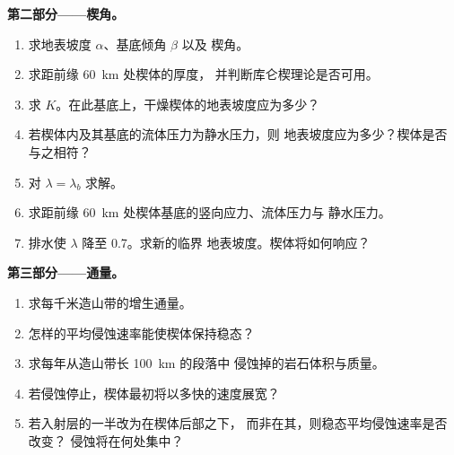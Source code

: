 \begin{problem}
\medskip\noindent\textbf{第二部分——楔角。}
\begin{enumerate}[resume]
  \item 求地表坡度 $\alpha$、基底倾角 $\beta$ 以及
        楔角。
  \item 求距前缘 \qty{60}{km} 处楔体的厚度，
        并判断库仑楔理论是否可用。
  \item 求 $K$。在此基底上，干燥楔体的地表坡度应为多少？
  \item 若楔体内及其基底的流体压力为静水压力，则
        地表坡度应为多少？楔体是否与之相符？
  \item 对 $\lambda = \lambda_b$ 求解。
  \item 求距前缘 \qty{60}{km} 处楔体基底的竖向应力、流体压力与
        静水压力。
  \item 排水使 $\lambda$ 降至 0.7。求新的临界
        地表坡度。楔体将如何响应？
\end{enumerate}

\medskip\noindent\textbf{第三部分——通量。}
\begin{enumerate}[resume]
  \item 求每千米造山带的增生通量。
  \item 怎样的平均侵蚀速率能使楔体保持稳态？
  \item 求每年从造山带长 \qty{100}{km} 的段落中
        侵蚀掉的岩石体积与质量。
  \item 若侵蚀停止，楔体最初将以多快的速度展宽？
  \item 若入射层的一半改为在楔体后部之下，
        而非在其，则稳态平均侵蚀速率是否改变？
        侵蚀将在何处集中？
\end{enumerate}


\end{problem}
